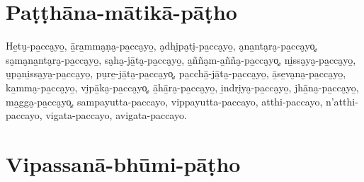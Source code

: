 \chapter{Paṭṭhāna-mātikā-pāṭho}


\begin{paritta}
He̱tu̮-pa̱cca̮yo̱, ā̱ra̱mma̮ṇa̮-pa̱cca̮yo̱, a̮dhi̮pa̮ti̮-pa̱cca̮yo̱, a̮na̱nta̮ra̮-pa̱cca̮yo͓,
sa̮ma̮na̱nta̮ra̮-pa̱cca̮yo̱, sa̮ha̮-jā̱ta̮-pa̱cca̮yo̱, a̱ñña̮m-a̱ñña̮-pa̱cca̮yo͓,
ni̱ssa̮ya̮-pa̱cca̮yo̱, u̮pa̮ni̱ssa̮ya̮-pa̱cca̮yo̱, pu̮re̱-jā̱ta̮-pa̱cca̮yo͓,
pa̱cchā̱-jā̱ta̮-pa̱cca̮yo̱, ā̱se̱va̮na̮-pa̱cca̮yo̱, ka̱mma̮-pa̱cca̮yo̱, vi̮pā̱ka̮-pa̱cca̮yo͓,
ā̱hā̱ra̮-pa̱cca̮yo̱, i̱ndri̮ya̮-pa̱cca̮yo̱, jhā̱na̮-pa̱cca̮yo̱, ma̱gga̮-pa̱cca̮yo͓,
sampayutta-paccayo, vippayutta-paccayo, atthi-paccayo, n'atthi-paccayo,
vigata-paccayo, avigata-paccayo.
\end{paritta}

\chapter{Vipassanā-bhūmi-pāṭho}


